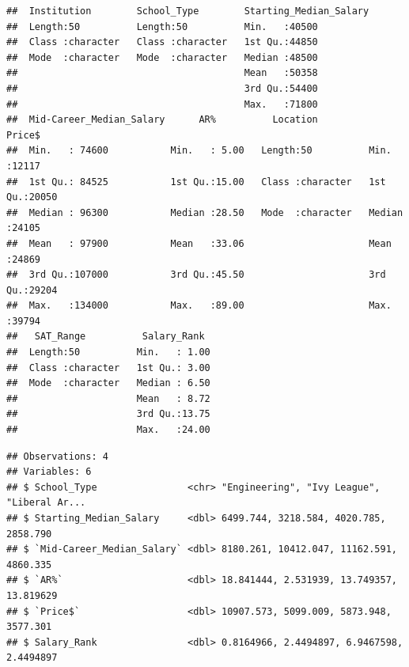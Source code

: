 \documentclass[]{article}
\newenvironment{Shaded}{\begin{snugshade}}{\end{snugshade}}
\newcommand{\KeywordTok}[1]{\textcolor[rgb]{0.13,0.29,0.53}{\textbf{#1}}}
\newcommand{\DataTypeTok}[1]{\textcolor[rgb]{0.13,0.29,0.53}{#1}}
\newcommand{\StringTok}[1]{\textcolor[rgb]{0.31,0.60,0.02}{#1}}
\newcommand{\OperatorTok}[1]{\textcolor[rgb]{0.81,0.36,0.00}{\textbf{#1}}}
\newcommand{\NormalTok}[1]{#1}
\begin{document}
\begin{verbatim}
##  Institution        School_Type        Starting_Median_Salary
##  Length:50          Length:50          Min.   :40500         
##  Class :character   Class :character   1st Qu.:44850         
##  Mode  :character   Mode  :character   Median :48500         
##                                        Mean   :50358         
##                                        3rd Qu.:54400         
##                                        Max.   :71800         
##  Mid-Career_Median_Salary      AR%          Location             Price$     
##  Min.   : 74600           Min.   : 5.00   Length:50          Min.   :12117  
##  1st Qu.: 84525           1st Qu.:15.00   Class :character   1st Qu.:20050  
##  Median : 96300           Median :28.50   Mode  :character   Median :24105  
##  Mean   : 97900           Mean   :33.06                      Mean   :24869  
##  3rd Qu.:107000           3rd Qu.:45.50                      3rd Qu.:29204  
##  Max.   :134000           Max.   :89.00                      Max.   :39794  
##   SAT_Range          Salary_Rank   
##  Length:50          Min.   : 1.00  
##  Class :character   1st Qu.: 3.00  
##  Mode  :character   Median : 6.50  
##                     Mean   : 8.72  
##                     3rd Qu.:13.75  
##                     Max.   :24.00
\end{verbatim}

\begin{Shaded}
\end{Shaded}

\begin{verbatim}
## Observations: 4
## Variables: 6
## $ School_Type                <chr> "Engineering", "Ivy League", "Liberal Ar...
## $ Starting_Median_Salary     <dbl> 6499.744, 3218.584, 4020.785, 2858.790
## $ `Mid-Career_Median_Salary` <dbl> 8180.261, 10412.047, 11162.591, 4860.335
## $ `AR%`                      <dbl> 18.841444, 2.531939, 13.749357, 13.819629
## $ `Price$`                   <dbl> 10907.573, 5099.009, 5873.948, 3577.301
## $ Salary_Rank                <dbl> 0.8164966, 2.4494897, 6.9467598, 2.4494897
\end{verbatim}
\end{document}
